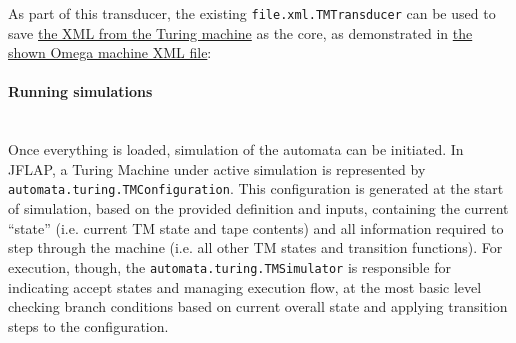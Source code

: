 \documentclass[12pt]{article}
\begin{document}
			As part of this transducer, the existing \texttt{file.xml.TMTransducer} can be used to save \hyperref[fig:tm-xml]{the XML from the Turing machine} as the core, as demonstrated in \hyperref[fig:omega-xml]{the shown Omega machine XML file}:\newpage
			\clearpage
		
		\paragraph{Running simulations}\hfill\\
			Once everything is loaded, simulation of the automata can be initiated. In JFLAP, a Turing Machine under active simulation is represented by \texttt{automata.turing.TMConfiguration}.
			This configuration is generated at the start of simulation, based on the provided definition and inputs, containing the current ``state'' (i.e. current TM state and tape contents) and all information required to step through the machine (i.e. all other TM states and transition functions).
			For execution, though, the \texttt{automata.turing.TMSimulator} is responsible for indicating accept states and managing execution flow, at the most basic level checking branch conditions based on current overall state and applying transition steps to the configuration.
\end{document}
